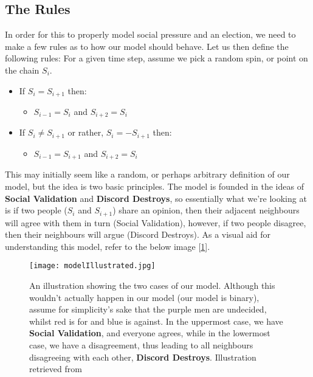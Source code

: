 \documentclass{article}
\begin{document}
\subsection{The Rules}
In order for this to properly model social pressure and an election, we need to make a few rules as to how our model should behave. \newline
Let us then define the following rules: \newline
For a given time step, assume we pick a random spin, or point on the chain $S_i$.
\begin{itemize}
    \item If $S_i = S_{i+1}$\newline
    then:
    \begin{itemize}
        \item $S_{i-1} = S_i$ and $S_{i+2} = S_i$
    \end{itemize}
    \item If $S_i \neq S_{i+1}$ or rather, $S_i = -S_{i+1}$\newline
    then:
    \begin{itemize}
        \item $S_{i-1} = S_{i+1}$ and $S_{i+2} = S_i$
    \end{itemize}
\end{itemize}
This may initially seem like a random, or perhaps arbitrary definition of our model, but the idea is two basic principles. \newline
The model is founded in the ideas of \textbf{Social Validation} and \textbf{Discord Destroys}, so essentially what we're looking at is if two people ($S_i$ and $S_{i+1}$) share an opinion, then their adjacent neighbours will agree with them in turn (Social Validation), however, if two people disagree, then their neighbours will argue (Discord Destroys). As a visual aid for understanding this model, refer to the below image [\ref{fig1}].
\begin{figure}[ht!]
    \centering
    \texttt{[image: modelIllustrated.jpg]}
    \caption{An illustration showing the two cases of our model. \newline
    Although this wouldn't actually happen in our model (our model is binary), assume for simplicity's sake that the purple men are undecided, whilst red is for and blue is against. \newline
    In the uppermost case, we have  \textbf{Social Validation}, and everyone agrees, while in the lowermost case, we have a disagreement, thus leading to all neighbours disagreeing with each other, \textbf{Discord Destroys}. \newline
    Illustration retrieved from \cite{sznajdwiki}}
    \label{fig1}
\end{figure}
\newpage
\end{document}
